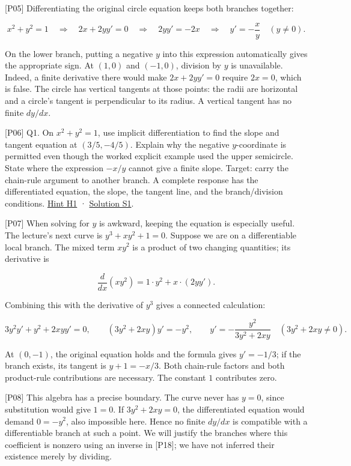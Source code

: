 \documentclass[
  11pt,
]{article}
\begin{document}
{[}P05{]} Differentiating the original circle equation keeps both
branches together:

\[
x^2+y^2=1
\quad\Longrightarrow\quad 2x+2yy'=0
\quad\Longrightarrow\quad 2yy'=-2x
\quad\Longrightarrow\quad y'=-\frac{x}{y}\quad(y\ne0).
\]

On the lower branch, putting a negative \(y\) into this expression
automatically gives the appropriate sign. At \((1,0)\) and \((-1,0)\),
division by \(y\) is unavailable. Indeed, a finite derivative there
would make \(2x+2yy'=0\) require \(2x=0\), which is false. The circle
has vertical tangents at those points: the radii are horizontal and a
circle's tangent is perpendicular to its radius. A vertical tangent has
no finite \(dy/dx\).

{[}P06{]} Q1. On \(x^2+y^2=1\), use implicit differentiation to find the
slope and tangent equation at \((3/5,-4/5)\). Explain why the negative
\(y\)-coordinate is permitted even though the worked explicit example
used the upper semicircle. State where the expression \(-x/y\) cannot
give a finite slope. Target: carry the chain-rule argument to another
branch. A complete response has the differentiated equation, the slope,
the tangent line, and the branch/division conditions.
\protect\hyperlink{h1}{Hint H1} · \protect\hyperlink{s1}{Solution S1}.

{[}P07{]} When solving for \(y\) is awkward, keeping the equation is
especially useful. The lecture's next curve is \(y^3+xy^2+1=0\). Suppose
we are on a differentiable local branch. The mixed term \(xy^2\) is a
product of two changing quantities; its derivative is

\[
\frac{d}{dx}(xy^2)=1\cdot y^2+x\cdot(2yy').
\]

Combining this with the derivative of \(y^3\) gives a connected
calculation:

\[
3y^2y'+y^2+2xyy'=0,
\qquad (3y^2+2xy)y'=-y^2,
\qquad y'=-\frac{y^2}{3y^2+2xy}\quad(3y^2+2xy\ne0).
\]

At \((0,-1)\), the original equation holds and the formula gives
\(y'=-1/3\); if the branch exists, its tangent is \(y+1=-x/3\). Both
chain-rule factors and both product-rule contributions are necessary.
The constant \(1\) contributes zero.

{[}P08{]} This algebra has a precise boundary. The curve never has
\(y=0\), since substitution would give \(1=0\). If \(3y^2+2xy=0\), the
differentiated equation would demand \(0=-y^2\), also impossible here.
Hence no finite \(dy/dx\) is compatible with a differentiable branch at
such a point. We will justify the branches where this coefficient is
nonzero using an inverse in {[}P18{]}; we have not inferred their
existence merely by dividing.
\end{document}
